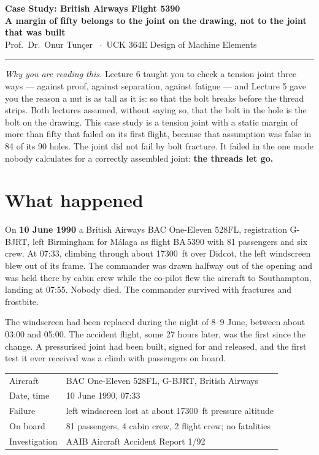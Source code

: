 \documentclass[11pt,a4paper]{article}
\begin{document}
\begin{center}
{\Large\textbf{Case Study: British Airways Flight 5390}}\\[3pt]
{\large\textbf{A margin of fifty belongs to the joint on the drawing, not to the joint that was built}}\\[5pt]
{\small Prof.\ Dr.\ Onur Tunçer \ $\cdot$\ UCK 364E Design of Machine Elements}
\end{center}

\vspace{2pt}\hrule\vspace{6pt}

\noindent\emph{Why you are reading this.} Lecture 6 taught you to check a tension joint three ways
--- against proof, against separation, against fatigue --- and Lecture 5 gave you the reason a nut
is as tall as it is: so that the bolt breaks before the thread strips. Both lectures assumed,
without saying so, that the bolt in the hole is the bolt on the drawing. This case study is a
tension joint with a static margin of more than fifty that failed on its first flight, because
that assumption was false in 84 of its 90 holes. The joint did not fail by bolt fracture. It
failed in the one mode nobody calculates for a correctly assembled joint: \textbf{the threads let
go.}

\section{What happened}

On \textbf{10 June 1990} a British Airways BAC One-Eleven 528FL, registration G-BJRT, left
Birmingham for Málaga as flight BA\,5390 with 81 passengers and six crew. At 07:33, climbing
through about \SI{17300}{ft} over Didcot, the left windscreen blew out of its frame. The commander
was drawn halfway out of the opening and was held there by cabin crew while the co-pilot flew the
aircraft to Southampton, landing at 07:55. Nobody died. The commander survived with fractures and
frostbite.

\medskip
The windscreen had been replaced during the night of 8--9 June, between about 03:00 and 05:00. The
accident flight, some 27 hours later, was the first since the change. A pressurised joint had been
built, signed for and released, and the first test it ever received was a climb with passengers on
board.

\begin{center}\small
\begin{tabular}{@{}ll@{}}
\toprule
Aircraft & BAC One-Eleven 528FL, G-BJRT, British Airways\\
Date, time & 10 June 1990, 07:33\\
Failure & left windscreen lost at about \SI{17300}{ft} pressure altitude\\
On board & 81 passengers, 4 cabin crew, 2 flight crew; no fatalities\\
Investigation & AAIB Aircraft Accident Report 1/92\\
\bottomrule
\end{tabular}
\end{center}
\end{document}
